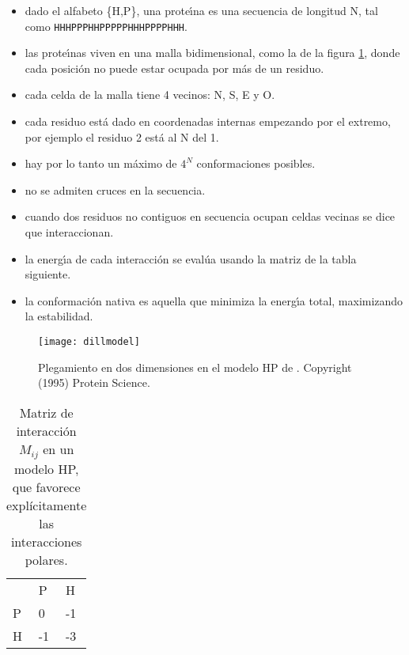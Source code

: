 \begin{itemize}
\item dado el alfabeto \{H,P\}, una prote\'\i{}na es una secuencia de longitud N, 
tal como \texttt{HHHPPPHHPPPPPHHHPPPPHHH}.
\item las prote\'\i{}nas viven en una malla bidimensional, como la de la figura \ref{fig:dillmodel}, donde cada posici\'{o}n no
puede estar ocupada por m\'{a}s de un residuo.
\item cada celda de la malla tiene 4 vecinos: N, S, E y O.
\item cada residuo est\'{a} dado en coordenadas internas empezando por el extremo, por ejemplo el residuo 2 est\'{a} al N del 1.
\item hay por lo tanto un m\'{a}ximo de $4^{N}$ conformaciones posibles.
\item no se admiten cruces en la secuencia.
\item cuando dos residuos no contiguos en secuencia ocupan celdas vecinas se dice que interaccionan.
\item la energ\'\i{}a de cada interacci\'{o}n se eval\'{u}a usando la matriz de la tabla siguiente. %
\item la conformaci\'{o}n nativa es aquella que minimiza la energ\'\i{}a total, maximizando la estabilidad. %
\end{itemize}

\begin{figure}
\begin{center} 
\texttt{[image: dillmodel]}
\caption%
{
Plegamiento en dos dimensiones en el modelo HP de \citet{Dill1995}. Copyright (1995) Protein Science.
}
\label{fig:dillmodel}
\end{center}
\end{figure}

\begin{table}[h]
\begin{center}
\begin{tabular}{|l|l|l|}\hline
 & P & H\\   
P & 0 & -1\\
H & -1 & -3\\ 
\end{tabular}
\end{center}
\caption%
{Matriz de interacci\'{o}n $M_{ij}$ en un modelo HP, que favorece expl\'{i}citamente las interacciones polares.}
\label{tab:matrizHP}
\end{table} 

